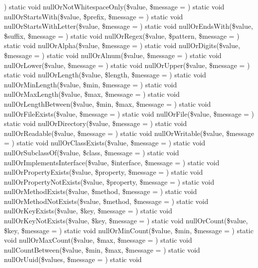 \textquotesingle{}\textquotesingle{})  static void null\+Or\+Not\+Whitespace\+Only(\$value, \$message = \textquotesingle{}\textquotesingle{})  static void null\+Or\+Starts\+With(\$value, \$prefix, \$message = \textquotesingle{}\textquotesingle{})  static void null\+Or\+Starts\+With\+Letter(\$value, \$message = \textquotesingle{}\textquotesingle{})  static void null\+Or\+Ends\+With(\$value, \$suffix, \$message = \textquotesingle{}\textquotesingle{})  static void null\+Or\+Regex(\$value, \$pattern, \$message = \textquotesingle{}\textquotesingle{})  static void null\+Or\+Alpha(\$value, \$message = \textquotesingle{}\textquotesingle{})  static void null\+Or\+Digits(\$value, \$message = \textquotesingle{}\textquotesingle{})  static void null\+Or\+Alnum(\$value, \$message = \textquotesingle{}\textquotesingle{})  static void null\+Or\+Lower(\$value, \$message = \textquotesingle{}\textquotesingle{})  static void null\+Or\+Upper(\$value, \$message = \textquotesingle{}\textquotesingle{})  static void null\+Or\+Length(\$value, \$length, \$message = \textquotesingle{}\textquotesingle{})  static void null\+Or\+Min\+Length(\$value, \$min, \$message = \textquotesingle{}\textquotesingle{})  static void null\+Or\+Max\+Length(\$value, \$max, \$message = \textquotesingle{}\textquotesingle{})  static void null\+Or\+Length\+Between(\$value, \$min, \$max, \$message = \textquotesingle{}\textquotesingle{})  static void null\+Or\+File\+Exists(\$value, \$message = \textquotesingle{}\textquotesingle{})  static void null\+Or\+File(\$value, \$message = \textquotesingle{}\textquotesingle{})  static void null\+Or\+Directory(\$value, \$message = \textquotesingle{}\textquotesingle{})  static void null\+Or\+Readable(\$value, \$message = \textquotesingle{}\textquotesingle{})  static void null\+Or\+Writable(\$value, \$message = \textquotesingle{}\textquotesingle{})  static void null\+Or\+Class\+Exists(\$value, \$message = \textquotesingle{}\textquotesingle{})  static void null\+Or\+Subclass\+Of(\$value, \$class, \$message = \textquotesingle{}\textquotesingle{})  static void null\+Or\+Implements\+Interface(\$value, \$interface, \$message = \textquotesingle{}\textquotesingle{})  static void null\+Or\+Property\+Exists(\$value, \$property, \$message = \textquotesingle{}\textquotesingle{})  static void null\+Or\+Property\+Not\+Exists(\$value, \$property, \$message = \textquotesingle{}\textquotesingle{})  static void null\+Or\+Method\+Exists(\$value, \$method, \$message = \textquotesingle{}\textquotesingle{})  static void null\+Or\+Method\+Not\+Exists(\$value, \$method, \$message = \textquotesingle{}\textquotesingle{})  static void null\+Or\+Key\+Exists(\$value, \$key, \$message = \textquotesingle{}\textquotesingle{})  static void null\+Or\+Key\+Not\+Exists(\$value, \$key, \$message = \textquotesingle{}\textquotesingle{})  static void null\+Or\+Count(\$value, \$key, \$message = \textquotesingle{}\textquotesingle{})  static void null\+Or\+Min\+Count(\$value, \$min, \$message = \textquotesingle{}\textquotesingle{})  static void null\+Or\+Max\+Count(\$value, \$max, \$message = \textquotesingle{}\textquotesingle{})  static void null\+Count\+Between(\$value, \$min, \$max, \$message = \textquotesingle{}\textquotesingle{})  static void null\+Or\+Uuid(\$values, \$message = \textquotesingle{}\textquotesingle{})  static void 